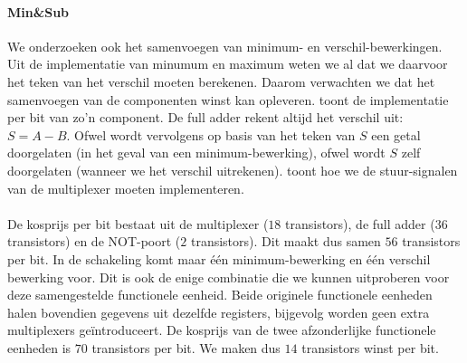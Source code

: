 \paragraph{Min\&Sub} We onderzoeken ook het samenvoegen van minimum- en verschil-bewerkingen. Uit de implementatie van minumum en maximum weten we al dat we daarvoor het teken van het verschil moeten berekenen. Daarom verwachten we dat het samenvoegen van de componenten winst kan opleveren.  toont de implementatie per bit van zo'n component.
De full adder rekent altijd het verschil uit: $S=A-B$. Ofwel wordt vervolgens op basis van het teken van $S$ een getal doorgelaten (in het geval van een minimum-bewerking), ofwel wordt $S$ zelf doorgelaten (wanneer we het verschil uitrekenen).
 toont hoe we de stuur-signalen van de multiplexer moeten implementeren.
\paragraph{}
De kosprijs per bit bestaat uit de multiplexer ($18$ transistors), de full adder ($36$ transistors) en de NOT-poort ($2$ transistors). Dit maakt dus samen $56$ transistors per bit. In de schakeling komt maar \'e\'en minimum-bewerking en \'e\'en verschil bewerking voor. Dit is ook de enige combinatie die we kunnen uitproberen voor deze samengestelde functionele eenheid. Beide originele functionele eenheden halen bovendien gegevens uit dezelfde registers, bijgevolg worden geen extra multiplexers ge\"introduceert. De kosprijs van de twee afzonderlijke functionele eenheden is $70$ transistors per bit. We maken dus $14$ transistors winst per bit.
